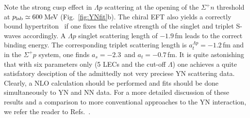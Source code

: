 \documentclass[aps,rmp,nofootinbib,twocolumn,floatfix]{revtex4}
\begin{document}
\noindent
Note the strong cusp effect in $\Lambda p$ scattering at the
opening of the $\Sigma^+ n$ threshold at $p_{\rm lab} \simeq 600\,$MeV
(Fig.~\ref{fig:YNfit}b).
The chiral EFT also yields a correctly bound 
hypertriton~\cite{Haidenbauer:2007ra} if one fixes the relative strength of
the singlet and triplet S-waves accordingly. 
A $\Lambda p$ singlet scattering length of $-1.9\,$fm leads
to the correct binding energy. The corresponding triplet scattering length
is $a_t^{\Lambda p} = -1.2\,$fm and in the $\Sigma^+ p$ system, one finds
$a_s = -2.3\,$ and $a_t = -0.7\,$fm.  It is quite astonishing that with six
parameters only (5 LECs and the cut-off $\Lambda$) one achieves a quite
satisfatory desciption of the admittedly not very preciese YN scattering
data. Clearly, a NLO calculation should be performed and fits should
be done simultaneously to YN and NN data.
For a more detailed discussion of these 
results and a comparison to more conventional approaches to the YN
interaction, we refer the reader to Refs.~\cite{Polinder:2006zh,Haidenbauer:2007ra}.
\end{document}
